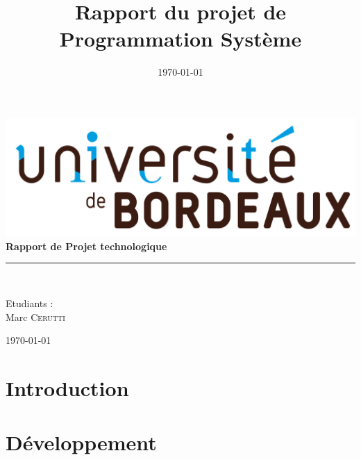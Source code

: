 \documentclass{article}
\title{Rapport du projet de Programmation Système}
\date{\today}
\begin{document}
\begin{titlepage}
 \begin{sffamily}
  \begin{center}
            \includegraphics[scale=0.04]{img/ubx-logo.png}
            \\[2cm]
        
    
    {\huge \bfseries Rapport de Projet technologique\\[0.5cm] }

    \rule{\linewidth}{.5pt}
    \\[2cm]

    \begin{minipage}{0.4\textwidth}
      \begin{flushleft} \large
        \author{}Etudiants :\\
        	Marc \textsc{Cerutti}\\
      \end{flushleft}
    \end{minipage}

    \vfill

    {\large \today}

  \end{center}
  \end{sffamily}
  
\end{titlepage}

\newpage

\tableofcontents

\newpage
\part{Introduction}

\newpage
\part{Développement}
\end{document}

